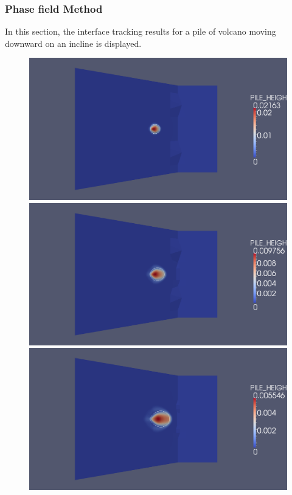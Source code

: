 \documentclass[letterpaper,10pt]{article}
\begin{document}
\subsubsection{Phase field Method}

In this section, the interface tracking results for a pile of volcano moving downward on an incline 
is displayed. 


\begin{figure}[H]
  \begin{minipage}[b]{.5\linewidth}
    \centering
    \includegraphics[width=1\textwidth]{IMAGES/phase_field/1.png}
    \includegraphics[width=1\textwidth]{IMAGES/phase_field/2.png}
    \includegraphics[width=1\textwidth]{IMAGES/phase_field/3.png}

\end{minipage}
\end{figure}
\end{document}
